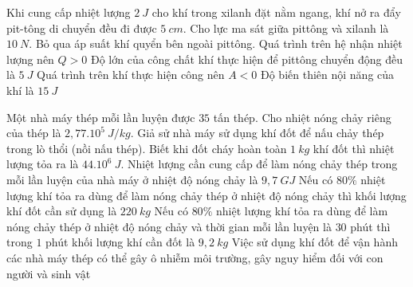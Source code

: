 \begin{ex}
	Khi cung cấp nhiệt lượng $2\ J$ cho khí trong xilanh đặt nằm ngang, khí nở ra đẩy pit-tông di chuyển đều đi được $5\ cm$. Cho lực ma sát giữa pittông và xilanh là $10\ N$. Bỏ qua áp suất khí quyển bên ngoài pittông.
	\choiceTFt
	{\True Quá trình trên hệ nhận nhiệt lượng nên $Q > 0$}
	{Độ lớn của công chất khí thực hiện để pittông chuyển động đều là $5\ J$}
	{\True Quá trình trên khí thực hiện công nên $A < 0$}
	{Độ biến thiên nội năng của khí là $15\ J$}
\end{ex}

\begin{ex}
	Một nhà máy thép mỗi lần luyện được $35$ tấn thép. Cho nhiệt nóng chảy riêng của thép là $2,77.10^5\ J/kg$. Giả sử nhà máy sử dụng khí đốt để nấu chảy thép trong lò thổi (nồi nấu thép). Biết khi đốt cháy hoàn toàn $1\ kg$ khí đốt thì nhiệt lượng tỏa ra là $44.10^6\ J$.
	\choiceTFt
	{\True Nhiệt lượng cần cung cấp để làm nóng chảy thép trong mỗi lần luyện của nhà máy ở nhiệt độ nóng chảy là $9,7\ GJ$}
	{Nếu có $80\%$ nhiệt lượng khí tỏa ra dùng để làm nóng chảy thép ở nhiệt độ nóng chảy thì khối lượng khí đốt cần sử dụng là $220\ kg$}
	{\True Nếu có $80\%$ nhiệt lượng khí tỏa ra dùng để làm nóng chảy thép ở nhiệt độ nóng chảy và thời gian mỗi lần luyện là $30$ phút thì trong $1$ phút khối lượng khí cần đốt là $9,2\ kg$}
	{\True Việc sử dụng khí đốt để vận hành các nhà máy thép có thể gây ô nhiễm môi trường, gây nguy hiểm đối với con người và sinh vật}
\end{ex}

